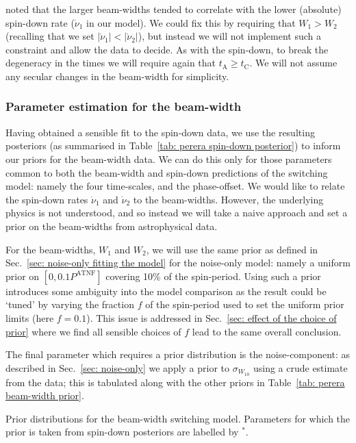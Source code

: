 \documentclass[../full_thesis/full_thesis.tex]{subfiles}
\newcommand{\thisdir}{../comparing_periodic_modulations}
\newcommand{\PATNF}{P^{\mathrm{ATNF}}}
\newcommand{\nudotOne}{\dot{\nu}_{1}}
\newcommand{\nudotTwo}{\dot{\nu}_{2}}
\newcommand{\Wone}{W_{1}}
\newcommand{\Wtwo}{W_{2}}
\newcommand{\tI}[1]{t_{\mathrm{#1}}}
\begin{document}
\citet{Lyne2010} noted that the larger beam-widths tended to correlate with the
lower (absolute) spin-down rate ($\nudotOne$ in our model). We could fix this
by requiring that $\Wone > \Wtwo$ (recalling that we set $|\nudotOne| <
|\nudotTwo|$), but instead we will not implement such a constraint and allow
the data to decide.  As with the spin-down, to break the degeneracy in the
times we will require again that $\tI{A} \ge \tI{C}$. We will not assume any
secular changes in the beam-width for simplicity.

\subsubsection{Parameter estimation for the beam-width}

Having obtained a sensible fit to the spin-down data, we use the resulting
posteriors (as summarised in Table~\ref{tab: perera spin-down posterior}) to
inform our priors for the beam-width data. We can do this only for those
parameters common to both the beam-width and spin-down predictions of the
switching model: namely the four time-scales, and the phase-offset. We would
like to relate the spin-down rates $\nudotOne$ and $\nudotTwo$ to the
beam-widths. However, the underlying physics is not
understood, and so instead we will take a naive approach and set a prior on the
beam-widths from astrophysical data.

For the beam-widths, $\Wone$ and $\Wtwo$, we will use the same prior as defined
in Sec.~\ref{sec: noise-only fitting the model} for the noise-only model:
namely a uniform prior on $[0, 0.1\PATNF]$ covering 10\% of the spin-period.
Using such a prior introduces some ambiguity into the model comparison as the
result could be `tuned' by varying the fraction $f$ of the spin-period used to
set the uniform prior limits (here $f=0.1$). This issue is addressed in
Sec.~\ref{sec: effect of the choice of prior} where we find all sensible
choices of $f$ lead to the same overall conclusion.

The final parameter which
requires a prior distribution is the noise-component: as described in
Sec.~\ref{sec: noise-only} we apply a prior to $\sigma_{W_{10}}$ using a crude
estimate from the data; this is tabulated along with the other priors in
Table~\ref{tab: perera beam-width prior}.
\begin{table}
\centering
\caption{Prior distributions for the beam-width switching model. Parameters
for which the prior is taken from spin-down posteriors are labelled by $^{*}$.}
\label{tab: perera beam-width prior}

\end{table}
\end{document}
